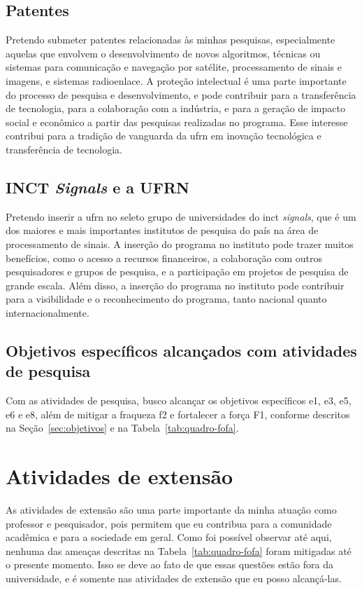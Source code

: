 \documentclass{article}
\begin{document}
\subsection{Patentes}

Pretendo submeter patentes relacionadas às minhas pesquisas, especialmente aquelas que envolvem o desenvolvimento de novos algoritmos, técnicas ou sistemas para comunicação e navegação por satélite, processamento de sinais e imagens, e sistemas radioenlace. A proteção intelectual é uma parte importante do processo de pesquisa e desenvolvimento, e pode contribuir para a transferência de tecnologia, para a colaboração com a indústria, e para a geração de impacto social e econômico a partir das pesquisas realizadas no programa. Esse interesse contribui para a tradição de vanguarda da \gls{ufrn} em inovação tecnológica e transferência de tecnologia.

\subsection{INCT \textit{Signals} e a UFRN}

Pretendo inserir a \gls{ufrn} no seleto grupo de universidades do \gls{inct} \textit{signals}, que é um dos maiores e mais importantes institutos de pesquisa do país na área de processamento de sinais. A inserção do programa no instituto pode trazer muitos benefícios, como o acesso a recursos financeiros, a colaboração com outros pesquisadores e grupos de pesquisa, e a participação em projetos de pesquisa de grande escala. Além disso, a inserção do programa no instituto pode contribuir para a visibilidade e o reconhecimento do programa, tanto nacional quanto internacionalmente.

\subsection{Objetivos específicos alcançados com atividades de pesquisa}

Com as atividades de pesquisa, busco alcançar os objetivos específicos e1, e3, e5, e6 e e8, além de mitigar a fraqueza f2 e fortalecer a força F1, conforme descritos na Seção~\ref{sec:objetivos} e na Tabela~\ref{tab:quadro-fofa}.

\section{Atividades de extensão}

As atividades de extensão são uma parte importante da minha atuação como professor e pesquisador, pois permitem que eu contribua para a comunidade acadêmica e para a sociedade em geral. Como foi possível observar até aqui, nenhuma das ameaças descritas na Tabela~\ref{tab:quadro-fofa} foram mitigadas até o presente momento. Isso se deve ao fato de que essas questões estão fora da universidade, e é somente nas atividades de extensão que eu posso alcançá-las.
\end{document}
